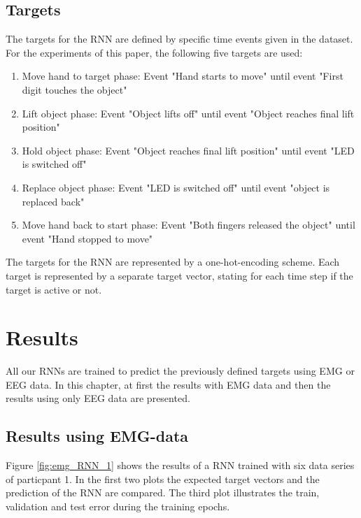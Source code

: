 \documentclass{article} %
\begin{document}
\subsection{Targets}
The targets for the RNN are defined by specific time events given in the dataset. For the experiments of this paper, the following five targets are used:
\begin{enumerate}
	\item Move hand to target phase: Event "Hand starts to move"  until event "First digit touches the object"
	\item Lift object phase: Event "Object lifts off" until event "Object reaches final lift position"
	\item Hold object phase: Event "Object reaches final lift position" until event "LED is switched off"
	\item Replace object phase: Event "LED is switched off" until event "object is replaced back"
	\item Move hand back to start phase: Event "Both fingers released the object" until event "Hand stopped to move"
\end{enumerate}
The targets for the RNN are represented by a one-hot-encoding scheme. Each target is represented by a separate target vector, stating for each time step if the target is active or not.

\section{Results}
All our RNNs are trained to predict the previously defined targets using EMG or EEG data. In this chapter, at first the results with EMG data and then the results using only EEG data are presented.
\subsection{Results using EMG-data}
Figure \ref{fig:emg_RNN_1} shows the results of a RNN trained with six data series of particpant 1. In the first two plots the expected target vectors and the prediction of the RNN are compared. The third plot illustrates the train, validation and test error during the training epochs.
\end{document}
